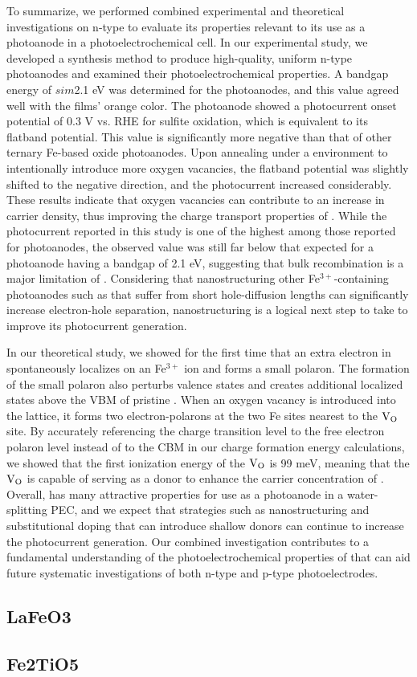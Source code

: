 To summarize, we performed combined experimental and theoretical investigations on n-type  to evaluate its properties relevant to its use as a photoanode in a photoelectrochemical cell. In our experimental study, we developed a synthesis method to produce high-quality, uniform n-type  photoanodes and examined their photoelectrochemical properties. A bandgap energy of $sim$2.1 eV was determined for the  photoanodes, and this value agreed well with the films’ orange color. The  photoanode showed a photocurrent onset potential of 0.3 V vs. RHE for sulfite oxidation, which is equivalent to its flatband potential. This value is significantly more negative than that of other ternary Fe-based oxide photoanodes. Upon annealing under a  environment to intentionally introduce more oxygen vacancies, the flatband potential was slightly shifted to the negative direction, and the photocurrent increased considerably. These results indicate that oxygen vacancies can contribute to an increase in carrier density, thus improving the charge transport properties of . While the photocurrent reported in this study is one of the highest among those reported for  photoanodes, the observed value was still far below that expected for a photoanode having a bandgap of 2.1 eV, suggesting that bulk recombination is a major limitation of . Considering that nanostructuring other Fe$^{3+}$-containing photoanodes such as  that suffer from short hole-diffusion lengths can significantly increase electron-hole separation, nanostructuring  is a logical next step to take to improve its photocurrent generation.

In our theoretical study, we showed for the first time that an extra electron in  spontaneously localizes on an Fe$^{3+}$ ion and forms a small polaron. The formation of the small polaron also perturbs valence states and creates additional localized states above the VBM of pristine . When an oxygen vacancy is introduced into the  lattice, it forms two electron-polarons at the two Fe sites nearest to the $\rm V_O$ site. By accurately referencing the charge transition level to the free electron polaron level instead of to the CBM in our charge formation energy calculations, we showed that the first ionization energy of the $\rm V_O$ is 99 meV, meaning that the $\rm V_O$ is capable of serving as a donor to enhance the carrier concentration of .
Overall,  has many attractive properties for use as a photoanode in a water-splitting PEC, and we expect that strategies such as nanostructuring and substitutional doping that can introduce shallow donors can continue to increase the photocurrent generation. Our combined investigation contributes to a fundamental understanding of the photoelectrochemical properties of  that can aid future systematic investigations of both n-type and p-type  photoelectrodes.




\subsection{LaFeO3}

\subsection{Fe2TiO5}
